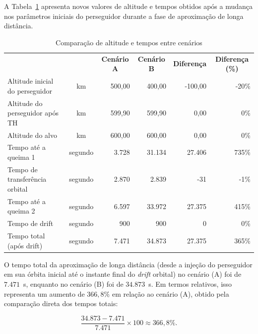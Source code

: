 A Tabela~\ref{tab:cap4_comp_alt_tempos} apresenta novos valores de altitude e tempos obtidos após a mudança nos parâmetros iniciais do perseguidor durante a fase de aproximação de longa distância.

\begin{table}[H]
\centering
\caption{Comparação de altitude e tempos entre cenários}
\begin{tabularx}{\linewidth}{|>{\raggedright\arraybackslash}X|
                             >{\raggedright\arraybackslash}c|
                             r|r|r|r|}
\hline
\multicolumn{1}{|c|}{\textbf{Variável}} &
\multicolumn{1}{c|}{\textbf{Unidade}} &
\multicolumn{1}{c|}{\textbf{Cenário A}} &
\multicolumn{1}{c|}{\textbf{Cenário B}} &
\multicolumn{1}{c|}{\textbf{Diferença}} &
\multicolumn{1}{c|}{\textbf{Diferença (\%)}} \\
\hhline{|=|=|=|=|=|=|}
Altitude inicial do perseguidor      & km     & 500,00 & 400,00 & -100,00 & -20\% \\
\hline
Altitude do perseguidor após TH      & km     & 599,90 & 599,90 & 0,00    & 0\%   \\
\hline
Altitude do alvo                     & km     & 600,00 & 600,00 & 0,00    & 0\%   \\
\hline
Tempo até a queima 1                 & segundo& 3.728  & 31.134 & 27.406  & 735\% \\
\hline
Tempo de transferência orbital       & segundo& 2.870  & 2.839  & -31     & -1\%  \\
\hline
Tempo até a queima 2                 & segundo& 6.597  & 33.972 & 27.375  & 415\% \\
\hline
Tempo de drift                       & segundo& 900    & 900    & 0       & 0\%   \\
\hline
Tempo total (após drift)             & segundo& 7.471  & 34.873 & 27.375  & 365\% \\
\hline
\end{tabularx}
\label{tab:cap4_comp_alt_tempos}
\end{table}

O tempo total da aproximação de longa distância (desde a injeção do perseguidor em sua órbita inicial até o instante final do \emph{drift} orbital) no cenário (A) foi de $7.471$~s, enquanto no cenário (B) foi de $34.873$~s.
Em termos relativos, isso representa um aumento de $366{,}8\%$ em relação ao cenário (A), obtido pela comparação direta dos tempos totais:

\begin{equation}
\frac{34.873 - 7.471}{7.471}\times 100 \approx 366{,}8\%.
\end{equation}

